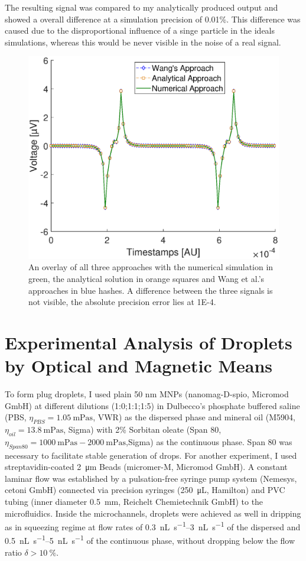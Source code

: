 The resulting signal was compared to my analytically produced output and showed a overall difference at a simulation precision of 0.01\%. This difference was caused due to the disproportional influence of a singe particle in the ideals simulations, whereas this would be never visible in the noise of a real signal. 
\begin{figure}[h!]
	\centering
	\includegraphics[clip,width=\linewidth]{Ressourcen/IMG/All_three_approaches}
	\caption{An overlay of all three approaches with the numerical simulation in green, the analytical solution in orange squares and Wang et al.'s approaches in blue hashes. A difference between the three signals is not visible, the absolute precision error lies at \num{1E-4}.}
	\label{fig:sim:all_three}
\end{figure}
\newpage

\section{Experimental Analysis of Droplets by Optical and Magnetic Means}
To form plug droplets, I used plain 50 nm MNPs (nanomag-D-spio, Micromod GmbH) at different dilutions (1:0;1:1;1:5)  in Dulbecco’s phosphate buffered saline (PBS, $\eta_{PBS} = \SI{1.05}{\milli\pascal\second}$, VWR) as the dispersed phase and mineral oil (M5904, $\eta_{oil}=\SI{13.8}{\milli\pascal\second}$, Sigma) with 2\%  Sorbitan oleate (Span 80, $\eta_{Span80} =\SI{1000}{\milli\pascal\second} - \SI{2000}{\milli\pascal\second}$,Sigma) as the continuous phase. Span 80 was necessary to facilitate stable generation of drops. For another experiment, I used streptavidin-coated \SI{2}{\micro\meter} Beads (micromer-M, Micromod GmbH). A constant laminar flow was established by a pulsation-free syringe pump system (Nemesys, cetoni GmbH) connected via precision syringes (\SI{250}{\micro\liter}, Hamilton) and PVC tubing (inner diameter \SI{0.5}{\mm}, Reichelt Chemietechnik GmbH) to the microfluidics.
Inside the microchannels, droplets were achieved as well in dripping as in squeezing regime at flow rates of \SIrange{0.3}{3}{\nano\liter\per\second} of the dispersed and \SIrange{0.5}{5}{\nano\liter\per\second} of the continuous phase, without dropping below the flow ratio $\delta > \SI{10}{\percent}$.

